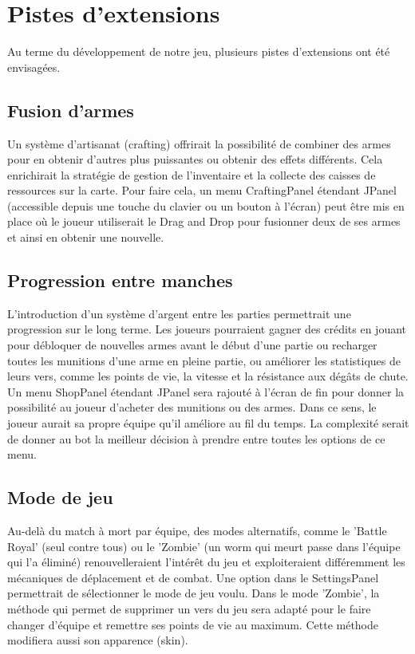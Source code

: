 \documentclass[a4paper, 12pt]{article}
\begin{document}
    \section{Pistes d'extensions}

        Au terme du développement de notre jeu, plusieurs pistes d'extensions ont été envisagées.
        
        \subsection{Fusion d'armes}
            Un système d'artisanat (crafting) offrirait la possibilité de combiner des armes pour en obtenir d'autres plus puissantes ou obtenir des effets différents.
            Cela enrichirait la stratégie de gestion de l'inventaire et la collecte des caisses de ressources sur la carte.
            Pour faire cela, un menu CraftingPanel étendant JPanel (accessible depuis une touche du clavier ou un bouton à l'écran) peut être mis en place où le joueur utiliserait le Drag and Drop pour fusionner deux de ses armes et ainsi en obtenir une nouvelle.

        \subsection{Progression entre manches}
            L'introduction d'un système d'argent entre les parties permettrait une progression sur le long terme.
            Les joueurs pourraient gagner des crédits en jouant pour débloquer de nouvelles armes avant le début d'une partie ou recharger toutes les munitions d'une arme en pleine partie, ou améliorer les statistiques de leurs vers, comme les points de vie, la vitesse et la résistance aux dégâts de chute.
            Un menu ShopPanel étendant JPanel sera rajouté à l'écran de fin pour donner la possibilité au joueur d'acheter des munitions ou des armes.
            Dans ce sens, le joueur aurait sa propre équipe qu'il améliore au fil du temps.
            La complexité serait de donner au bot la meilleur décision à prendre entre toutes les options de ce menu.

        \subsection{Mode de jeu}
            Au-delà du match à mort par équipe, des modes alternatifs, comme le 'Battle Royal' (seul contre tous) ou le 'Zombie' (un worm qui meurt passe dans l'équipe qui l'a éliminé) renouvelleraient l'intérêt du jeu et exploiteraient différemment les mécaniques de déplacement et de combat.
            Une option dans le SettingsPanel permettrait de sélectionner le mode de jeu voulu.
            Dans le mode 'Zombie', la méthode qui permet de supprimer un vers du jeu sera adapté pour le faire changer d'équipe et remettre ses points de vie au maximum. Cette méthode modifiera aussi son apparence (skin).
        
\end{document}

